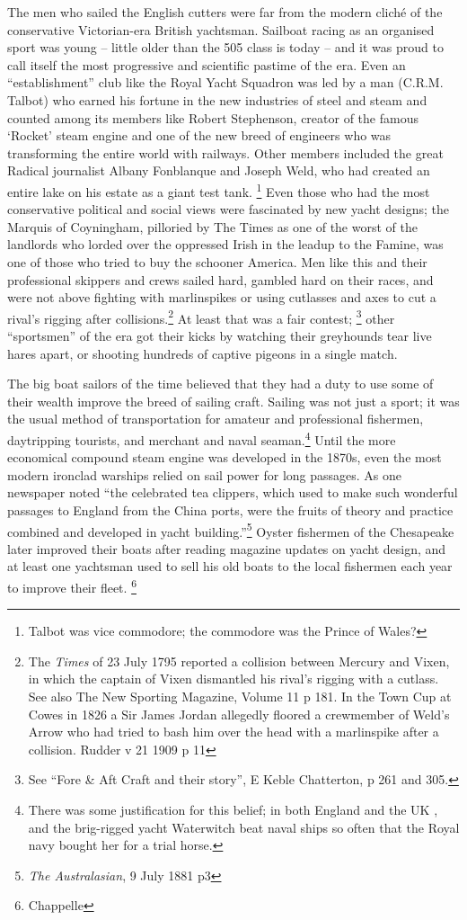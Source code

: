 \documentclass[
  letterpaper,
]{scrbook}
\begin{document}
The men who sailed the English cutters were far from the modern cliché
of the conservative Victorian-era British yachtsman. Sailboat racing as
an organised sport was young -- little older than the 505 class is today
-- and it was proud to call itself the most progressive and scientific
pastime of the era. Even an ``establishment'' club like the Royal Yacht
Squadron was led by a man (C.R.M. Talbot) who earned his fortune in the
new industries of steel and steam and counted among its members like
Robert Stephenson, creator of the famous `Rocket' steam engine and one
of the new breed of engineers who was transforming the entire world with
railways. Other members included the great Radical journalist Albany
Fonblanque and Joseph Weld, who had created an entire lake on his estate
as a giant test tank. \footnote{Talbot was vice commodore; the commodore
  was the Prince of Wales?} Even those who had the most conservative
political and social views were fascinated by new yacht designs; the
Marquis of Coyningham, pilloried by The Times as one of the worst of the
landlords who lorded over the oppressed Irish in the leadup to the
Famine, was one of those who tried to buy the schooner America. Men like
this and their professional skippers and crews sailed hard, gambled hard
on their races, and were not above fighting with marlinspikes or using
cutlasses and axes to cut a rival's rigging after collisions.\footnote{The
  \emph{Times} of 23 July 1795 reported a collision between Mercury and
  Vixen, in which the captain of Vixen dismantled his rival's rigging
  with a cutlass. See also The New Sporting Magazine, Volume 11 p 181.
  In the Town Cup at Cowes in 1826 a Sir James Jordan allegedly floored
  a crewmember of Weld's Arrow who had tried to bash him over the head
  with a marlinspike after a collision. Rudder v 21 1909 p 11} At least
that was a fair contest; \footnote{See ``Fore \& Aft Craft and their
  story'', E Keble Chatterton, p 261 and 305.} other ``sportsmen'' of
the era got their kicks by watching their greyhounds tear live hares
apart, or shooting hundreds of captive pigeons in a single match.

The big boat sailors of the time believed that they had a duty to use
some of their wealth improve the breed of sailing craft. Sailing was not
just a sport; it was the usual method of transportation for amateur and
professional fishermen, daytripping tourists, and merchant and naval
seaman.\footnote{There was some justification for this belief; in both
  England and the UK , and the brig-rigged yacht Waterwitch beat naval
  ships so often that the Royal navy bought her for a trial horse.}
Until the more economical compound steam engine was developed in the
1870s, even the most modern ironclad warships relied on sail power for
long passages. As one newspaper noted ``the celebrated tea clippers,
which used to make such wonderful passages to England from the China
ports, were the fruits of theory and practice combined and developed in
yacht building.''\footnote{\emph{The Australasian}, 9 July 1881 p3}
Oyster fishermen of the Chesapeake later improved their boats after
reading magazine updates on yacht design, and at least one yachtsman
used to sell his old boats to the local fishermen each year to improve
their fleet. \footnote{Chappelle}
\end{document}
